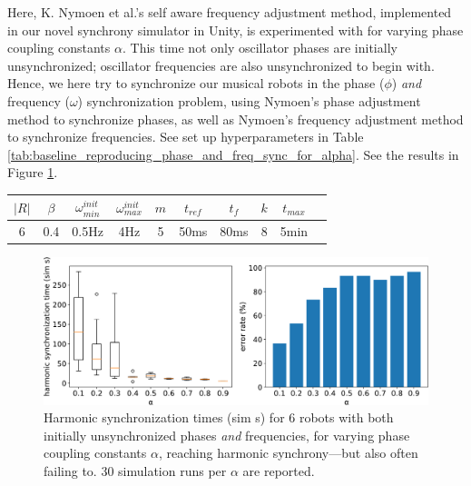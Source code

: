 		Here, K. Nymoen et al.'s self aware frequency adjustment method, implemented in our novel synchrony simulator in Unity, is experimented with for varying phase coupling constants $\alpha$. This time not only oscillator phases are initially unsynchronized; oscillator frequencies are also unsynchronized to begin with. Hence, we here try to synchronize our musical robots in the phase ($\phi$) \textit{and} frequency ($\omega$) synchronization problem, using Nymoen's phase adjustment method to synchronize phases, as well as Nymoen's frequency adjustment method to synchronize frequencies. See set up hyperparameters in Table \ref{tab:baseline_reproducing_phase_and_freq_sync_for_alpha}. See the results in Figure \ref{fig:baseline_reproducing_phase_and_freq_sync_for_alpha}.
		
		\begin{center}
		\begin{tabular}{ |c|c|c|c|c|c|c|c|c|c| } 
		\hline
		$|R|$ & $\beta$ & $\omega_{min}^{init}$ & $\omega_{max}^{init}$ & $m$ & $t_{ref}$ & $t_f$ & $k$ & $t_{max}$ \\
		\hline
		6 & 0.4 & 0.5Hz & 4Hz & 5 & 50ms & 80ms & 8 & 5min \\
		\hline
		\end{tabular}
		\label{tab:baseline_reproducing_phase_and_freq_sync_for_alpha}
		\end{center}
		
		\begin{figure}[ht!]
			\centering
			\includegraphics[width=\linewidth]{Assets/DocSegments/Chapters/ExperimentsAndResults/Figures/PerfScores/baseline_reproducing_phase_and_freq_sync_for_alpha.pdf}
			\caption{Harmonic synchronization times (sim s) for 6 robots with both initially unsynchronized phases \textit{and} frequencies, for varying phase coupling constants $\alpha$, reaching harmonic synchrony—but also often failing to. 30 simulation runs per $\alpha$ are reported.}
			\label{fig:baseline_reproducing_phase_and_freq_sync_for_alpha}
		\end{figure}
		
